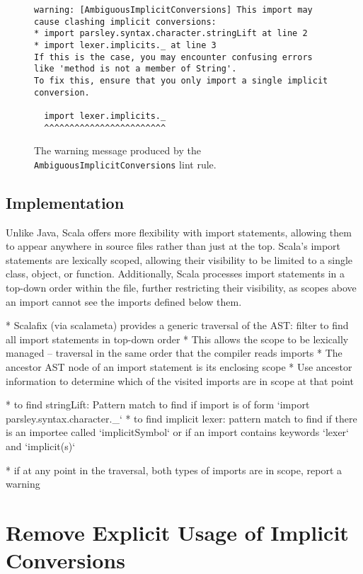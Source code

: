 \documentclass[../../main.tex]{subfiles}
\begin{document}
\begin{figure}[htbp]
\begin{verbatim}
warning: [AmbiguousImplicitConversions] This import may cause clashing implicit conversions:
* import parsley.syntax.character.stringLift at line 2
* import lexer.implicits._ at line 3
If this is the case, you may encounter confusing errors like 'method is not a member of String'.
To fix this, ensure that you only import a single implicit conversion.

  import lexer.implicits._
  ^^^^^^^^^^^^^^^^^^^^^^^^  
\end{verbatim}
\caption{The warning message produced by the \texttt{AmbiguousImplicitConversions} lint rule.}
\label{fig:ambiguous-implicits-warning}
\end{figure}

\subsection*{Implementation}
Unlike Java, Scala offers more flexibility with import statements, allowing them to appear anywhere in source files rather than just at the top.
Scala's import statements are lexically scoped, allowing their visibility to be limited to a single class, object, or function.
Additionally, Scala processes import statements in a top-down order within the file, further restricting their visibility, as scopes above an import cannot see the imports defined below them.


* Scalafix (via scalameta) provides a generic traversal of the AST: filter to find all import statements in top-down order
* This allows the scope to be lexically managed -- traversal in the same order that the compiler reads imports
* The ancestor AST node of an import statement is its enclosing scope
* Use ancestor information to determine which of the visited imports are in scope at that point

* to find stringLift: Pattern match to find if import is of form `import parsley.syntax.character.\_`
* to find implicit lexer: pattern match to find if there is an importee called `implicitSymbol` or if an import contains keywords `lexer` and `implicit(s)`

* if at any point in the traversal, both types of imports are in scope, report a warning

\section{Remove Explicit Usage of Implicit Conversions}
\end{document}
